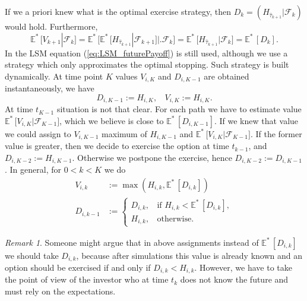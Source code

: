 \documentclass[a4paper,12pt, oneside]{book}
\theoremstyle{definition}
\theoremstyle{remark}
\newtheorem{remark}{Remark}[chapter]
\def\Em{{\mathbb{E}^*}\,}
\def\bpipe{{\bigl|\bigr.}}
\begin{document}
If we a priori knew what is the optimal exercise strategy, then $D_{k} = (H_{\hat{\tau}_{k+1}} | \mathcal{F}_{k})$ would hold. Furthermore,
\begin{equation}
 \label{eq:LSM_futurePayoff}
 \Em\bigl[ V_{k+1} | \mathcal{F}_{k} \bigr] = \Em\bigl[ \Em[H_{\hat{\tau}_{k+1}} | \mathcal{F}_{k+1}] \bpipe \mathcal{F}_{k} \bigr] = \Em\bigl[ H_{\hat{\tau}_{k+1}} | \mathcal{F}_k \bigr] = \Em[ D_{k} ]. 
\end{equation}
In the LSM equation (\ref{eq:LSM_futurePayoff}) is still used, although we use a strategy which only approximates the optimal stopping. Such strategy is built dynamically. At time point $K$ values $V_{i,K}$ and $D_{i,K-1}$ are obtained instantaneously, we have
\[ D_{i,K-1} := H_{i,K},\ \ \ \ V_{i,K} := H_{i,K}.\]
At time $t_{K-1}$ situation is not that clear. For each path we have to estimate value $\Em\bigl[ V_{i,K} | \mathcal{F}_{K-1} \bigr]$, which we believe is close to $\Em[D_{i,K-1}]$. If we knew that value we could assign to $V_{i,K-1}$ maximum of $H_{i,K-1}$ and $\Em\bigl[ V_{i,K} | \mathcal{F}_{K-1} \bigr]$. If the former value is greater, then we decide to exercise the option at time $t_{k-1}$, and $D_{i,K-2} := H_{i,K-1}$. Otherwise we postpone the exercise, hence $D_{i,K-2} := D_{i,K-1}$. In general, for $0 < k < K$ we do
\begin{align*}
 V_{i,k} &:= \max(H_{i,k}, \Em[D_{i,k}]) \\
 D_{i,k-1} &:= \begin{cases}
                 D_{i,k},\ \ \ \ \text{if } H_{i,k} < \Em[D_{i,k}], \\
                 H_{i,k},\ \ \ \ \text{otherwise.}
               \end{cases}
\end{align*}
\begin{remark}
 Someone might argue that in above assignments instead of $\Em[D_{i,k}]$ we should take $D_{i,k}$, because after simulations this value is already known and an option should be exercised if and only if $D_{i,k} < H_{i,k}$. However, we have to take the point of view of the investor who at time $t_k$ does not know the future and must rely on the expectations. 
\end{remark}
\end{document}
